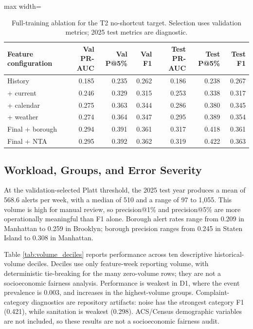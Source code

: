 \documentclass[pdflatex,sn-mathphys-num]{sn-jnl}
\begin{document}
\begin{table}[!htbp]
\caption{Full-training ablation for the T2 no-shortcut target. Selection uses validation metrics; 2025 test metrics are diagnostic.}\label{tab:ablation}
\centering
\begin{adjustbox}{max width=\textwidth}
\begin{tabular}{@{}lrrrrrr@{}}
\toprule
Feature configuration & Val PR-AUC & Val P@5\% & Val F1 & Test PR-AUC & Test P@5\% & Test F1 \\
\midrule
History & 0.185 & 0.235 & 0.262 & 0.186 & 0.238 & 0.267 \\
+ current & 0.246 & 0.329 & 0.315 & 0.253 & 0.338 & 0.317 \\
+ calendar & 0.275 & 0.363 & 0.344 & 0.286 & 0.380 & 0.345 \\
+ weather & 0.274 & 0.364 & 0.347 & 0.295 & 0.389 & 0.354 \\
Final + borough & 0.294 & 0.391 & 0.361 & 0.317 & 0.418 & 0.361 \\
Final + NTA & 0.295 & 0.392 & 0.362 & 0.319 & 0.422 & 0.363 \\
\bottomrule
\end{tabular}
\end{adjustbox}
\end{table}

\subsection{Workload, Groups, and Error Severity}\label{subsec:workload}

At the validation-selected Platt threshold, the 2025 test year produces a mean of 568.6 alerts per week, with a median of 510 and a range of 97 to 1,055. This volume is high for manual review, so precision@1\% and precision@5\% are more operationally meaningful than F1 alone. Borough alert rates range from 0.209 in Manhattan to 0.259 in Brooklyn; borough precision ranges from 0.245 in Staten Island to 0.308 in Manhattan.

Table \ref{tab:volume_deciles} reports performance across ten descriptive historical-volume deciles. Deciles use only feature-week reporting volume, with deterministic tie-breaking for the many zero-volume rows; they are not a socioeconomic fairness analysis. Performance is weakest in D1, where the event prevalence is 0.003, and increases in the highest-volume groups. Complaint-category diagnostics are repository artifacts: noise has the strongest category F1 (0.421), while sanitation is weakest (0.298). ACS/Census demographic variables are not included, so these results are not a socioeconomic fairness audit.
\end{document}
